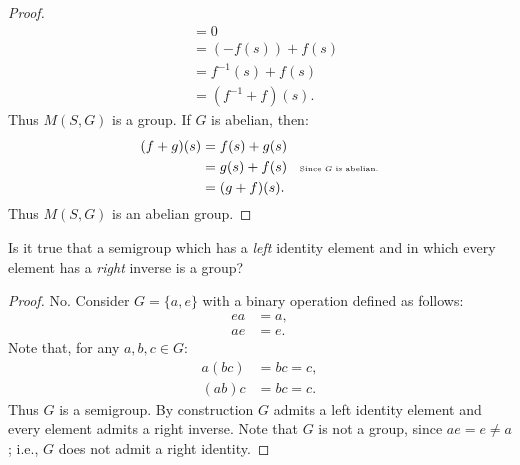 {\begin{proof}
\begin{equation*}
\begin{split}
                    & = 0 \\
                    & = (-f(s)) + f(s) \\
                    & = f^{-1}(s) + f(s) \\
                    & = (f^{-1} + f)(s).
                \end{split}
                \end{equation*}
            Thus $M(S,G)$ is a group. If $G$ is abelian, then:
                \begin{equation*}
                \begin{split}
                    (f+g)(s)
                    & = f(s) + g(s) \\
                    & = g(s) + f(s) \h9 \text{\tiny Since $G$ is abelian.} \\
                    & = (g+f)(s).
                \end{split}
                \end{equation*}
            Thus $M(S,G)$ is an abelian group.
        \end{proof}}
    
    \begin{exercise}
        Is it true that a semigroup which has a \textit{left} identity element and in which every element has a \textit{right} inverse is a group?
    \end{exercise}
        {\color{blue} \begin{proof}
            No. Consider $G = \{a,e\}$ with a binary operation defined as follows:
                \begin{equation*}
                \begin{split}
                    ea &= a, \\
                    ae &= e.
                \end{split}
                \end{equation*}
            Note that, for any $a,b,c \in G$:
                \begin{equation*}
                \begin{split}
                    a(bc) &= bc = c, \\
                    (ab)c &= bc = c.
                \end{split}
                \end{equation*}
            Thus $G$ is a semigroup. By construction $G$ admits a left identity element and every element admits a right inverse. Note that $G$ is not a group, since $ae = e \neq a$; i.e., $G$ does not admit a right identity.
        \end{proof}}
    
